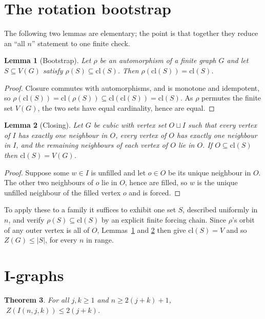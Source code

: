 \documentclass[11pt]{article}
\newtheorem{theorem}{Theorem}
\newtheorem{lemma}[theorem]{Lemma}
\theoremstyle{definition}
\begin{document}
\section{The rotation bootstrap}
The following two lemmas are elementary; the point is that together they
reduce an ``all $n$'' statement to one finite check.

\begin{lemma}[Bootstrap]\label{lem:boot}
Let $\rho$ be an automorphism of a finite graph $G$ and let $S\subseteq V(G)$
satisfy $\rho(S)\subseteq \mathrm{cl}(S)$. Then
$\rho(\mathrm{cl}(S))=\mathrm{cl}(S)$.
\end{lemma}

\begin{proof}
Closure commutes with automorphisms, and is monotone and idempotent, so
$\rho(\mathrm{cl}(S))=\mathrm{cl}(\rho(S))\subseteq
\mathrm{cl}(\mathrm{cl}(S))=\mathrm{cl}(S)$. As $\rho$ permutes the finite set
$V(G)$, the two sets have equal cardinality, hence are equal.
\end{proof}

\begin{lemma}[Closing]\label{lem:close}
Let $G$ be cubic with vertex set $O\sqcup I$ such that every vertex of $I$ has
exactly one neighbour in $O$, every vertex of $O$ has exactly one neighbour in
$I$, and the remaining neighbours of each vertex of $O$ lie in $O$. If
$O\subseteq \mathrm{cl}(S)$ then $\mathrm{cl}(S)=V(G)$.
\end{lemma}

\begin{proof}
Suppose some $w\in I$ is unfilled and let $o\in O$ be its unique neighbour in
$O$. The other two neighbours of $o$ lie in $O$, hence are filled, so $w$ is
the unique unfilled neighbour of the filled vertex $o$ and is forced.
\end{proof}

To apply these to a family it suffices to exhibit one set $S$, described
uniformly in $n$, and verify $\rho(S)\subseteq\mathrm{cl}(S)$ by an explicit
finite forcing chain. Since $\rho$'s orbit of any outer vertex is all of $O$,
Lemmas~\ref{lem:boot} and \ref{lem:close} then give $\mathrm{cl}(S)=V$ and so
$Z(G)\le|S|$, for every $n$ in range.

\section{I-graphs}
\begin{theorem}\label{thm:I}
For all $j,k\ge1$ and $n\ge 2(j+k)+1$, $\;Z(I(n,j,k))\le 2(j+k)$.
\end{theorem}
\end{document}
